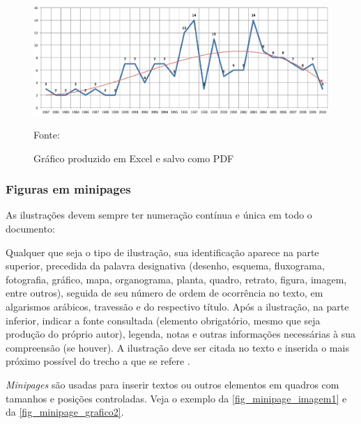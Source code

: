 \begin{figure}[H]
	\caption{\label{fig_grafico}Gráfico produzido em Excel e salvo como PDF}
	\includegraphics[scale=0.5]{USPSC-img/USPSC-modelo-img-grafico.pdf}
	\begin{flushleft}
		Fonte: 
	\end{flushleft}	
\end{figure}

\subsubsection{Figuras em minipages}

As ilustrações devem sempre ter numeração contínua e única em todo o documento:


\begin{citacao}
	Qualquer que seja o tipo de ilustração, sua identificação aparece na parte
	superior, precedida da palavra designativa (desenho, esquema, fluxograma,
	fotografia, gráfico, mapa, organograma, planta, quadro, retrato, figura,
	imagem, entre outros), seguida de seu número de ordem de ocorrência no texto,
	em algarismos arábicos, travessão e do respectivo título. Após a ilustração, na
	parte inferior, indicar a fonte consultada (elemento obrigatório, mesmo que
	seja produção do próprio autor), legenda, notas e outras informações
	necessárias à sua compreensão (se houver). A ilustração deve ser citada no
	texto e inserida o mais próximo possível do trecho a que se
	refere \cite{nbr14724}.
\end{citacao}

\emph{Minipages} são usadas para inserir textos ou outros elementos em quadros
com tamanhos e posições controladas. Veja o exemplo da
\autoref{fig_minipage_imagem1} e da \autoref{fig_minipage_grafico2}.

